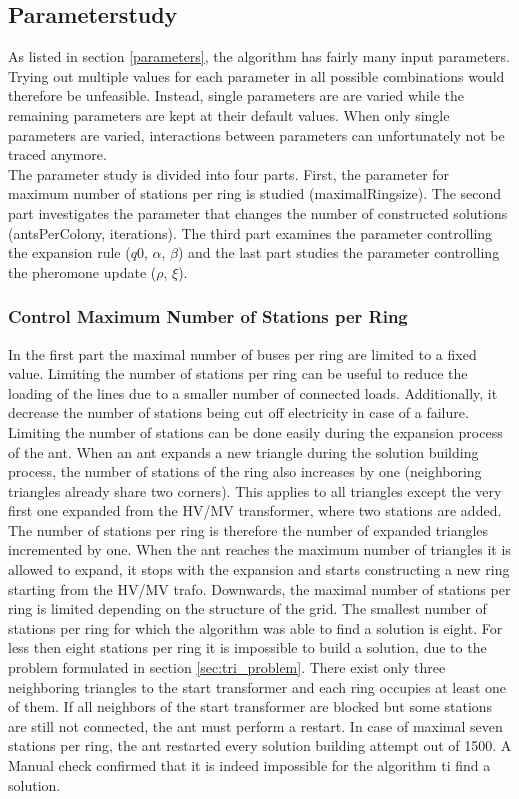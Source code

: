 \subsection{Parameterstudy}
As listed in section \ref{parameters}, the algorithm has fairly many input parameters. Trying out multiple values for each parameter in all possible combinations would therefore be unfeasible. Instead, single parameters are are varied while the remaining parameters are kept at their default values. When only single parameters are varied, interactions between parameters can unfortunately not be traced anymore. \\

The parameter study is divided into four parts. First, the parameter for maximum number of stations per ring is studied (maximalRingsize). The second part investigates the parameter that changes the number of constructed solutions (antsPerColony, iterations). The third part examines the parameter controlling the expansion rule ($q0$, $\alpha$, $\beta$) and the last part studies the parameter controlling the pheromone update ($\rho$, $\xi$).

\subsubsection{Control Maximum Number of Stations per Ring}\label{stations_per_ring}
In the first part the maximal number of buses per ring are limited to a fixed value. Limiting the number of stations per ring can be useful to reduce the loading of the lines due to a smaller number of connected loads. Additionally, it decrease the number of stations being cut off electricity in case of a failure. Limiting the number of stations can be done easily during the expansion process of the ant. When an ant expands a new triangle during the solution building process, the number of stations of the ring also increases by one (neighboring triangles already share two corners). This applies to all triangles except the very first one expanded from the HV/MV transformer, where two stations are added. The number of stations per ring is therefore the number of expanded triangles incremented by one. When the ant reaches the maximum number of triangles it is allowed to expand, it stops with the expansion and starts constructing a new ring starting from the HV/MV trafo. Downwards, the maximal number of stations per ring is limited depending on the structure of the grid. The smallest number of stations per ring for which the algorithm was able to find a solution is eight. For less then eight stations per ring it is impossible to build a solution, due to the problem formulated in section \ref{sec:tri_problem}. There exist only three neighboring triangles to the start transformer and each ring occupies at least one of them. If all neighbors of the start transformer are blocked but some stations are still not connected, the ant must perform a restart. In case of maximal seven stations per ring, the ant restarted every solution building attempt out of 1500. A Manual check confirmed that it is indeed impossible for the algorithm ti find a solution.

